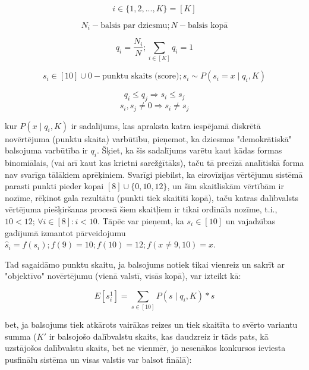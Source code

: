 \documentclass[12pt, a4paper]{article}
\begin{document}
\begin{equation}
 i \in \lbrace 1,2,...,K \rbrace = [K]
\end{equation}

\begin{equation}
    N_i - \text{balsis par dziesmu}; N - \text{balsis kopā}
\end{equation}

\begin{equation}
    q_i = \frac{N_i}{N}; \sum_{i\in[K]} q_i = 1
\end{equation}

\begin{equation}
    s_i \in [10] \cup 0 - \text{punktu skaits (score)}; s_i \sim P(s_i = x \mid q_i, K)
\end{equation}

\begin{equation}
    q_i \leq q_j \Rightarrow s_i \leq s_j
\end{equation}
\begin{equation}
    s_i, s_j \neq 0 \Rightarrow s_i \neq s_j
\end{equation}


kur $P(x \mid q_i, K)$ ir sadalījums, kas apraksta katra iespējamā diskrētā novērtējuma (punktu skaita) varbūtību, pieņemot, ka dziesmas "demokrātiskā" balsojuma varbūtība ir $q_i$. Šķiet, ka šis sadalījums varētu kaut kādas formas binomiālais, (vai arī kaut kas krietni sarežģītāks), taču tā precīzā analītiskā forma nav svarīga tālākiem aprēķiniem. Svarīgi piebilst, ka eirovīzijas vērtējumu sistēmā parasti punkti pieder kopai $[8] \cup \lbrace 0, 10, 12 \rbrace$, un šīm skaitliskām vērtībām ir nozīme, rēķinot gala rezultātu (punkti tiek skaitīti kopā), taču katras dalībvalsts vērtējuma piešķiršanas procesā šiem skaitļiem ir tikai ordināla nozīme, t.i., $10<12$; $\forall i \in [8]: i < 10$. Tāpēc var pieņemt, ka $s_i \in [10]$ un vajadzības gadījumā izmantot pārveidojumu $\hat s_i = f(s_i); f(9)=10;f(10)=12;f(x \neq 9,10)=x$.

Tad sagaidāmo punktu skaitu, ja balsojums notiek tikai vienreiz un sakrīt ar "objektīvo" novērtējumu (vienā valstī, visās kopā), var izteikt kā:

\begin{equation}
    E[s_i^1] = \sum_{s\in[10]}P(s\mid q_i, K)*s
\end{equation}

bet, ja balsojums tiek atkārots vairākas reizes un tiek skaitīta to svērto variantu summa ($K'$ ir balsojošo dalībvalstu skaits, kas daudzreiz ir tāds pats, kā uzstājošos dalībvalstu skaits, bet ne vienmēr, jo nesenākos konkursos ieviesta pusfinālu sistēma un visas valstis var balsot finālā):
\end{document}
